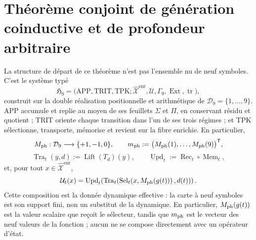
\section{Théorème conjoint de génération coinductive et de profondeur arbitraire}
\label{sec:c27-generacion-coinductiva-profundidad-arbitraria}

La structure de départ de ce théorème n'est pas l'ensemble nu de neuf
symboles. C'est le système typé
\[
 \mathfrak H_9=
 \bigl(\mathrm{APP},\mathrm{TRIT},\mathrm{TPK};
       \widehat{\mathcal X}^{\mathrm{enr}},\mathcal U,
       \Gamma_9,\operatorname{Ext},\operatorname{tr}\bigr),
\]
construit sur la double réalisation positionnelle et arithmétique de
\(\mathcal D_9=\{1,\ldots,9\}\). APP accumule et replie au moyen de ses feuillets
\(\Sigma\) et \(\Pi\), en conservant résidu et quotient ; TRIT oriente chaque
transition dans l'un de ses trois régimes ; et TPK sélectionne, transporte,
mémorise et revient sur la fibre enrichie. En particulier,
\[
 M_{\rm ph}:\mathcal D_9\longrightarrow\{+1,-1,0\},
 \qquad
 m_{\rm ph}:=\bigl(M_{\rm ph}(1),\ldots,M_{\rm ph}(9)\bigr)^{\mathsf T},
\]
\[
 \operatorname{Tra}_t(y,d):=\operatorname{Lift}(T_d)(y),
 \qquad
 \operatorname{Upd}_t:=\operatorname{Rec}_t\circ\operatorname{Mem}_t,
\]
et, pour tout \(x\in\widehat{\mathcal X}^{\mathrm{enr}}\),
\[
 \mathcal U_t(x)
 =\operatorname{Upd}_t\!\left(
   \operatorname{Tra}_t\!\left(
    \operatorname{Sel}_t\!\left(x,M_{\rm ph}(g(t))\right),d(t)
   \right)\right).
\]
Cette composition est la donnée dynamique effective : la carte à neuf symboles
est son support fini, non un substitut de la dynamique. En particulier,
\(M_{\rm ph}(g(t))\) est la valeur scalaire que reçoit le sélecteur, tandis
que \(m_{\rm ph}\) est le vecteur des neuf valeurs de la fonction ; aucun
ne se compose directement avec un opérateur d'état.

